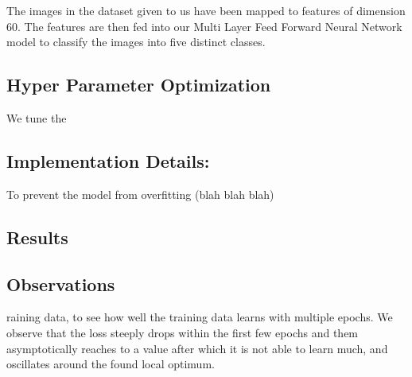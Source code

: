 \documentclass{article}
\begin{document}
The images in the dataset given to us have been mapped to features of dimension 60. 
The features are then fed into our Multi Layer Feed Forward Neural Network model to classify the images into five 
distinct classes. 

\subsection{Hyper Parameter Optimization}

We tune the 

\subsection{Implementation Details:}

To prevent the model from overfitting (blah blah blah)


\subsection{Results}


\subsection{Observations}
raining data, to see how well the training data learns with multiple epochs. We observe that the loss steeply drops within the first few epochs and them asymptotically reaches to a value after which it is not able to learn much, and oscillates around the found local optimum.
\end{document}
